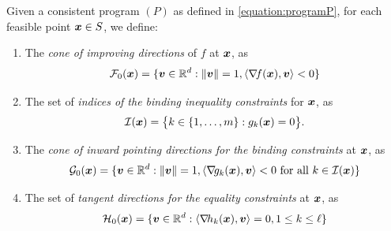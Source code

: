 \begin{definition}
Given a consistent program $(P)$ as defined in \eqref{equation:programP}, for each feasible point $\boldsymbol{x} \in S$, we define:
\begin{enumerate}
	\item The \emph{cone of improving directions} of $f$ at $\boldsymbol{x}$, as
	\begin{equation*}
	\mathcal{F}_0(\boldsymbol{x}) = \{ \boldsymbol{v} \in \mathbb{R}^d : \lVert \boldsymbol{v} \rVert=1, \langle \mathop{\nabla\! {f}}(\boldsymbol{x}), \boldsymbol{v} \rangle < 0 \}
	\end{equation*}
	\item The set of \emph{indices of the binding inequality constraints} for $\boldsymbol{x}$, as
	\begin{equation*}
	\mathcal{I}(\boldsymbol{x}) = \big\{ k \in \{1, \dotsc, m\} : g_k(\boldsymbol{x}) = 0 \big\}.
	\end{equation*}
	\item The \emph{cone of inward pointing directions for the binding constraints} at $\boldsymbol{x}$, as
	\begin{equation*}
	\mathcal{G}_0(\boldsymbol{x}) = \{ \boldsymbol{v} \in \mathbb{R}^d : \lVert \boldsymbol{v} \rVert=1, \langle \mathop{\nabla\! {g_k}}(\boldsymbol{x}), \boldsymbol{v} \rangle < 0 \text{ for all } k \in \mathcal{I}(\boldsymbol{x}) \}
	\end{equation*}
	\item The set of \emph{tangent directions for the equality constraints} at $\boldsymbol{x}$, as
	\begin{equation*}
	\mathcal{H}_0(\boldsymbol{x}) = \{ \boldsymbol{v} \in \mathbb{R}^d : \langle \mathop{\nabla\! {h_k}}(\boldsymbol{x}), \boldsymbol{v} \rangle = 0, 1 \leq k \leq \ell \}
	\end{equation*}
\end{enumerate}
\end{definition}

